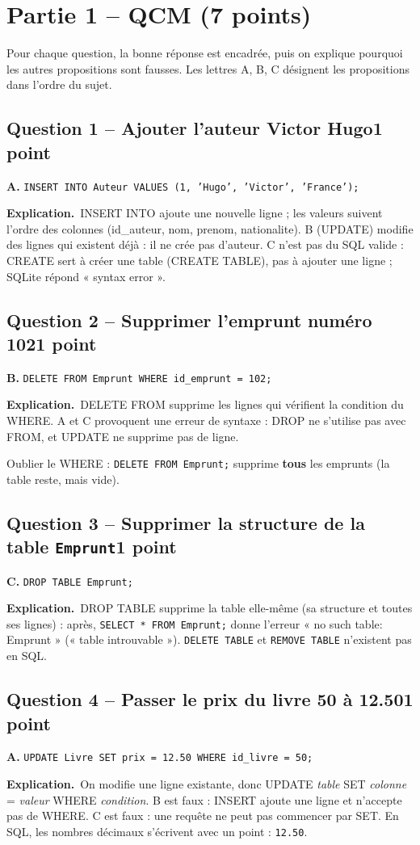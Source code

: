 \documentclass[11pt, a4paper]{exam}
\newcommand{\code}[1]{\texttt{#1}}
\newcommand{\Qt}[2]{\subsection*{#1\hfill{\normalfont\small #2}}}
\newcommand{\explication}{\noindent\textbf{Explication.}\ }
\newcommand{\sql}[1]{\textsc{#1}}
\begin{document}
\section*{Partie 1 -- QCM (7 points)}

Pour chaque question, la bonne réponse est encadrée, puis on explique pourquoi les autres propositions sont fausses. Les lettres A, B, C désignent les propositions dans l'ordre du sujet.

\Qt{Question 1 -- Ajouter l'auteur Victor Hugo}{1 point}
\begin{reponse}
\textbf{A.} \code{INSERT INTO Auteur VALUES (1, 'Hugo', 'Victor', 'France');}
\end{reponse}
\explication \sql{INSERT INTO} ajoute une nouvelle ligne ; les valeurs suivent l'ordre des colonnes (id\_auteur, nom, prenom, nationalite). B (\sql{UPDATE}) modifie des lignes qui existent déjà : il ne crée pas d'auteur. C n'est pas du SQL valide : \sql{CREATE} sert à créer une table (\sql{CREATE TABLE}), pas à ajouter une ligne ; SQLite répond « syntax error ».

\Qt{Question 2 -- Supprimer l'emprunt numéro 102}{1 point}
\begin{reponse}
\textbf{B.} \code{DELETE FROM Emprunt WHERE id\_emprunt = 102;}
\end{reponse}
\explication \sql{DELETE FROM} supprime les lignes qui vérifient la condition du \sql{WHERE}. A et C provoquent une erreur de syntaxe : \sql{DROP} ne s'utilise pas avec \sql{FROM}, et \sql{UPDATE} ne supprime pas de ligne.

\begin{erreur}
Oublier le \sql{WHERE} : \code{DELETE FROM Emprunt;} supprime \textbf{tous} les emprunts (la table reste, mais vide).
\end{erreur}

\Qt{Question 3 -- Supprimer la structure de la table \code{Emprunt}}{1 point}
\begin{reponse}
\textbf{C.} \code{DROP TABLE Emprunt;}
\end{reponse}
\explication \sql{DROP TABLE} supprime la table elle-même (sa structure et toutes ses lignes) : après, \code{SELECT * FROM Emprunt;} donne l'erreur « no such table: Emprunt » (« table introuvable »). \code{DELETE TABLE} et \code{REMOVE TABLE} n'existent pas en SQL.

\Qt{Question 4 -- Passer le prix du livre 50 à 12.50}{1 point}
\begin{reponse}
\textbf{A.} \code{UPDATE Livre SET prix = 12.50 WHERE id\_livre = 50;}
\end{reponse}
\explication On modifie une ligne existante, donc \sql{UPDATE} \textit{table} \sql{SET} \textit{colonne} = \textit{valeur} \sql{WHERE} \textit{condition}. B est faux : \sql{INSERT} ajoute une ligne et n'accepte pas de \sql{WHERE}. C est faux : une requête ne peut pas commencer par \sql{SET}. En SQL, les nombres décimaux s'écrivent avec un point : \code{12.50}.
\end{document}

